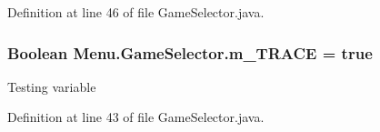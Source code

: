 Definition at line 46 of file Game\+Selector.\+java.

\hypertarget{class_menu_1_1_game_selector_a2eb9bf5de7be21be696db9228f4bff0f}{}
\subsubsection[{m\+\_\+\+T\+R\+A\+C\+E}]{\setlength{\rightskip}{0pt plus 5cm}Boolean Menu.\+Game\+Selector.\+m\+\_\+\+T\+R\+A\+C\+E = true\hspace{0.3cm}{\ttfamily [static]}}\label{class_menu_1_1_game_selector_a2eb9bf5de7be21be696db9228f4bff0f}
Testing variable 

Definition at line 43 of file Game\+Selector.\+java.



